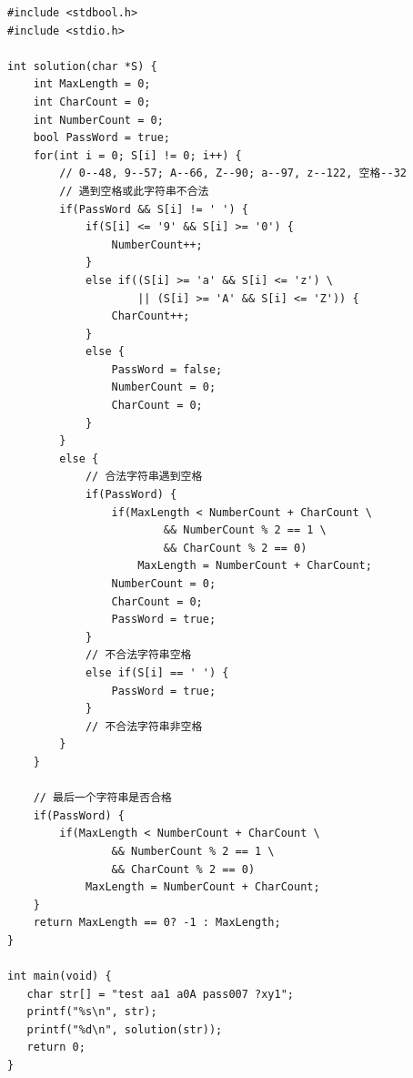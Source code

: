 \begin{spacing}{1.5}
\begin{lstlisting}
#include <stdbool.h>
#include <stdio.h>

int solution(char *S) {
    int MaxLength = 0;
    int CharCount = 0;
    int NumberCount = 0;
    bool PassWord = true;
    for(int i = 0; S[i] != 0; i++) {
        // 0--48, 9--57; A--66, Z--90; a--97, z--122, 空格--32
        // 遇到空格或此字符串不合法
        if(PassWord && S[i] != ' ') {
            if(S[i] <= '9' && S[i] >= '0') {
                NumberCount++;
            }
            else if((S[i] >= 'a' && S[i] <= 'z') \
                    || (S[i] >= 'A' && S[i] <= 'Z')) {
                CharCount++;
            }
            else {
                PassWord = false;
                NumberCount = 0;
                CharCount = 0;
            }
        }
        else {
            // 合法字符串遇到空格
            if(PassWord) {
                if(MaxLength < NumberCount + CharCount \
                        && NumberCount % 2 == 1 \
                        && CharCount % 2 == 0)
                    MaxLength = NumberCount + CharCount;
                NumberCount = 0;
                CharCount = 0;
                PassWord = true;
            }
            // 不合法字符串空格
            else if(S[i] == ' ') {
                PassWord = true;
            }
            // 不合法字符串非空格
        }
    }

    // 最后一个字符串是否合格
    if(PassWord) {
        if(MaxLength < NumberCount + CharCount \
                && NumberCount % 2 == 1 \
                && CharCount % 2 == 0)
            MaxLength = NumberCount + CharCount;
    }
    return MaxLength == 0? -1 : MaxLength;
}

int main(void) {
   char str[] = "test aa1 a0A pass007 ?xy1";
   printf("%s\n", str);
   printf("%d\n", solution(str));
   return 0;
}
\end{lstlisting}

\end{spacing}


